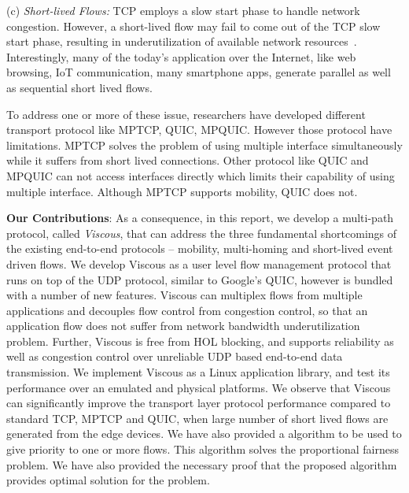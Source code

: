 (c) \textit{Short-lived Flows:} TCP employs a slow start phase to handle network congestion. However, a short-lived flow may fail to come out of the TCP slow start phase, resulting in underutilization of available network resources~\cite{de2016throughput}. Interestingly, many of the today's application over the Internet, like web browsing, IoT communication, many smartphone apps, generate parallel as well as sequential short lived flows. 

To address one or more of these issue, researchers have developed different transport protocol like MPTCP, QUIC, MPQUIC. However those protocol have limitations. MPTCP solves the problem of using multiple interface simultaneously while it suffers from short lived connections. Other protocol like QUIC and MPQUIC can not access interfaces directly which limits their capability of using multiple interface. Although MPTCP supports mobility, QUIC does not.

\textbf{Our Contributions}:
As a consequence, in this report, we develop a multi-path protocol, called {\em Viscous}, that can address the three fundamental shortcomings of the existing end-to-end protocols -- mobility, multi-homing and short-lived event driven flows. We develop Viscous as a user level flow management protocol that runs on top of the UDP protocol, similar to Google's QUIC, however is bundled with a number of new features. Viscous can multiplex flows from multiple applications and decouples flow control from congestion control, so that an application flow does not suffer from network bandwidth underutilization problem. Further, Viscous is free from HOL blocking, and supports reliability as well as congestion control over unreliable UDP based end-to-end data transmission. We implement Viscous as a Linux application library, and test its performance over an emulated and physical platforms. We observe that Viscous can significantly improve the transport layer protocol performance compared to standard TCP, MPTCP and QUIC, when large number of short lived flows are generated from the edge devices. We have also provided a algorithm to be used to give priority to one or more flows. This algorithm solves the proportional fairness problem. We have also provided the necessary proof that the proposed algorithm provides optimal solution for the problem.
